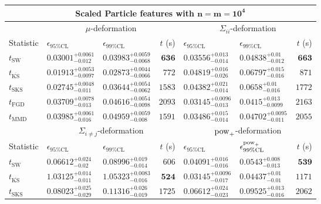 \begin{tabular}{l|llr|llr}
	\toprule
	\multicolumn{7}{c}{{\bf Scaled Particle features with $\mathbf{n=m=10^{4}}$}} \\
	\toprule
	\multicolumn{1}{c}{} & \multicolumn{3}{c}{$\mu$-deformation} & \multicolumn{3}{c}{$\Sigma_{ii}$-deformation} \\
	Statistic & $\epsilon_{95\%\mathrm{CL}}$ & $\epsilon_{99\%\mathrm    {CL}}$ & $t$ (s) & $\epsilon_{95\%\mathrm{CL}}$ & $\epsilon_{99\%\mathrm{CL}}$ & $t$ (s) \\
	\midrule
	$t_{\mathrm{SW}}$ & $0.03001_{-0.012}^{+0.0061}$ & $0.03983_{-0.0068}^{+0.0059}$ & ${\mathbf{636}}$ & $0.03556_{-0.014}^{+0.013}$ & $0.04838_{-0.012}^{+0.01}$ & ${\mathbf{663}}$ \\
	$t_{\overline{\mathrm{KS}}}$ & ${\mathbf{0.01913_{-0.0097}^{+0.0053}}}$ & ${\mathbf{0.02873_{-0.0066}^{+0.0044}}}$ & $772$ & $0.04819_{-0.026}^{+0.016}$ & $0.06797_{-0.016}^{+0.015}$ & $871$ \\
	$t_{\mathrm{SKS}}$ & $0.02745_{-0.011}^{+0.0048}$ & $0.03644_{-0.0062}^{+0.0054}$ & $1583$ & $0.04382_{-0.014}^{+0.021}$ & $0.0658_{-0.016}^{+0.01}$ & $1772$ \\
	$t_{\mathrm{FGD}}$ & $0.03709_{-0.013}^{+0.0078}$ & $0.04616_{-0.0098}^{+0.0054}$ & $2093$ & ${\mathbf{0.03145_{-0.013}^{+0.0096}}}$ & ${\mathbf{0.0415_{-0.0099}^{+0.013}}}$ & $2163$ \\
	$t_{\mathrm{MMD}}$ & $0.03985_{-0.016}^{+0.0061}$ & $0.04959_{-0.008}^{+0.0059}$ & $1591$ & $0.03486_{-0.014}^{+0.015}$ & $0.04702_{-0.011}^{+0.0095}$ & $2055$ \\
	\toprule
	\multicolumn{1}{c}{} & \multicolumn{3}{c}{$\Sigma_{i\neq j}$-deformation} & \multicolumn{3}{c}{$\rm{pow}_{+}$-deformation} \\
	Statistic & $\epsilon_{95\%\mathrm{CL}}$ & $\epsilon_{99\%\mathrm{CL}}$ & $t$ (s) & $\epsilon_{95\%\mathrm{CL}}$ & $\epsilon^{\rm   {pow}_{+}}_{99\%\mathrm{CL}}$ & $t$ (s) \\
	\midrule
	$t_{\mathrm{SW}}$ & $0.06612_{-0.02}^{+0.024}$ & $0.08996_{-0.014}^{+0.019}$ & $606$ & $0.04091_{-0.016}^{+0.016}$ & $0.0543_{-0.013}^{+0.008}$ & ${\mathbf{539}}$ \\
	$t_{\overline{\mathrm{KS}}}$ & $1.03125_{-0.011}^{+0.014}$ & $1.05323_{-0.016}^{+0.0083}$ & ${\mathbf{524}}$ & ${\mathbf{0.03145_{-0.017}^{+0.0096}}}$ & $0.04437_{-0.01}^{+0.01}$ & $1171$ \\
	$t_{\mathrm{SKS}}$ & $0.08023_{-0.029}^{+0.025}$ & $0.11316_{-0.019}^{+0.026}$ & $1725$ & $0.06612_{-0.023}^{+0.024}$ & $0.09525_{-0.016}^{+0.013}$ & $2062$ \\

\end{tabular}

